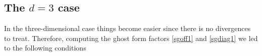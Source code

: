 





















\subsection{The $d=3$ case} 
\label{d=3}

In the three-dimensional case things become easier since there is no divergences to treat. Therefore, computing the ghost form factors \eqref{sgoff1} and \eqref{sgdiag1} we led to the following conditions 



